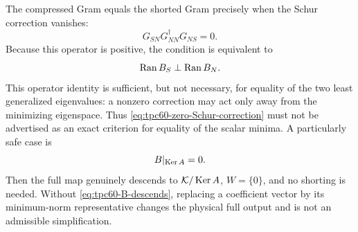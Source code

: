 The compressed Gram equals the shorted Gram precisely when the Schur
correction vanishes:
\begin{equation}
 G_{SN}G_{NN}^\dagger G_{NS}=0.
 \label{eq:tpc60-zero-Schur-correction}
\end{equation}
Because this operator is positive, the condition is equivalent to
\begin{equation}
 \operatorname{Ran} B_S\perp\operatorname{Ran} B_N.
 \label{eq:tpc60-orthogonal-SN-output}
\end{equation}
This operator identity is sufficient, but not necessary, for equality of
the two least generalized eigenvalues: a nonzero correction may act only
away from the minimizing eigenspace.  Thus
\eqref{eq:tpc60-zero-Schur-correction} must not be advertised as an exact
criterion for equality of the scalar minima.
A particularly safe case is
\begin{equation}
 B|_{\operatorname{Ker} A}=0.
 \label{eq:tpc60-B-descends}
\end{equation}
Then the full map genuinely descends to \(\mathcal K/\operatorname{Ker} A\), \(W=\{0\}\), and
no shorting is needed.  Without \eqref{eq:tpc60-B-descends}, replacing a
coefficient vector by its minimum-norm representative changes the physical
full output and is not an admissible simplification.
